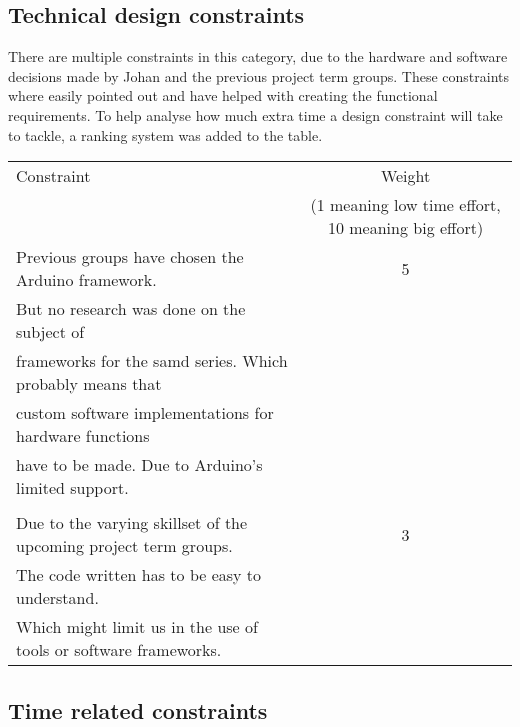 \subsection{Technical design constraints}
There are multiple constraints in this category, due to the hardware and software decisions made by Johan and the previous project term groups. These constraints where easily pointed out and have helped with creating the functional requirements. To help analyse how much extra time a design constraint will take to tackle, a ranking system was added to the table.\\
\begin{tabular}{|l|c|}
\hline
    Constraint & Weight \\
               & (1 meaning low time effort, 10 meaning big effort) \\
    \hline\hline
     Previous groups have chosen the Arduino framework. & 5\\
     But no research was done on the subject of \\frameworks for the samd series. Which probably means that \\ custom software implementations for hardware functions \\have to be made. Due to Arduino's limited support.\\ & \\
     \hline
     Due to the varying skillset of the upcoming project term groups. & 3\\
     The code written has to be easy to understand. \\ Which might limit us in the use of tools or software frameworks.\\
     \hline
     
     
     
     
\end{tabular}

\subsection{Time related constraints}